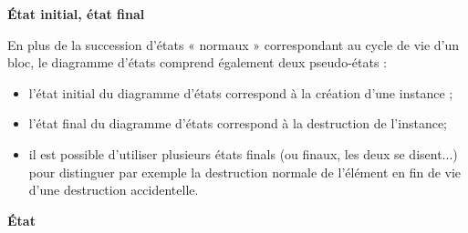 \documentclass[10pt]{article}
\begin{document}
\begin{defi}
\begin{minipage}[c]{.8\linewidth}
\textbf{État initial, état final}

En plus de la succession d’états « normaux » correspondant au cycle de vie d’un bloc, le diagramme
d’états comprend également deux pseudo-états :
\begin{itemize}
\item l’état initial du diagramme d’états correspond à la création d’une instance ;
\item l’état final du diagramme d’états correspond à la destruction de l’instance;
\item il est possible d’utiliser plusieurs états finals (ou finaux, les deux se disent...) pour distinguer par
exemple la destruction normale de l’élément en fin de vie d’une destruction accidentelle.
\end{itemize}

\end{minipage} \hfill
\begin{minipage}[c]{.15 \linewidth}
\begin{center}
\end{center}
\end{minipage}
\end{defi}


\begin{defi}
\begin{minipage}[c]{.8\linewidth}
\textbf{État}

\end{minipage} \hfill
\begin{minipage}[c]{.15 \linewidth}
\begin{center}
\end{center}
\end{minipage}
\end{defi}


\begin{thebibliography}{2}
 
\end{thebibliography}
\end{document}
